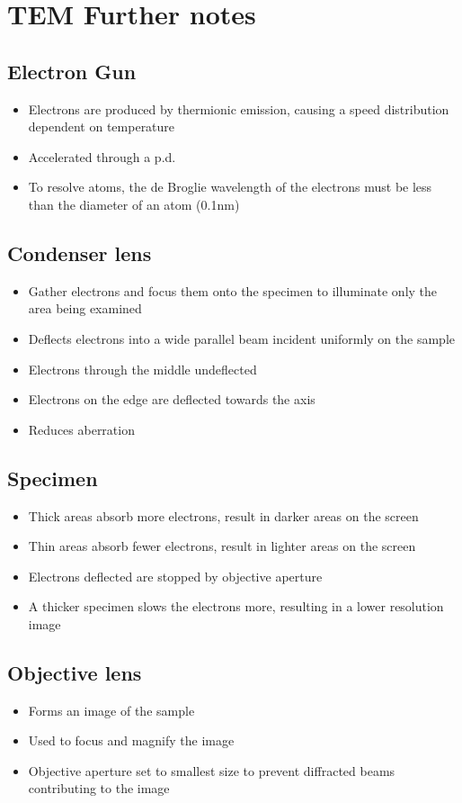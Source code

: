 \documentclass[12pt]{article}
\begin{document}
\section{TEM Further notes}
\subsection{Electron Gun}
\begin{itemize}
\item Electrons are produced by thermionic emission, causing a speed distribution dependent on temperature
\item Accelerated through a p.d.
\item To resolve atoms, the de Broglie wavelength of the electrons must be less than the diameter of an atom (0.1nm)
\end{itemize}
\subsection{Condenser lens}
\begin{itemize}
\item Gather electrons and focus them onto the specimen to illuminate only the area being examined
\item Deflects electrons into a wide parallel beam incident uniformly on the sample
\item Electrons through the middle undeflected
\item Electrons on the edge are deflected towards the axis
\item Reduces aberration 
\end{itemize}
\subsection{Specimen}
\begin{itemize}
\item Thick areas absorb more electrons, result in darker areas on the screen
\item Thin areas absorb fewer electrons, result in lighter areas on the screen
\item Electrons deflected are stopped by objective aperture
\item A thicker specimen slows the electrons more, resulting in a lower resolution image
\end{itemize}
\subsection{Objective lens}
\begin{itemize}
\item Forms an image of the sample
\item Used to focus and magnify the image
\item Objective aperture set to smallest size to prevent diffracted beams contributing to the image
\end{itemize}
\end{document}
